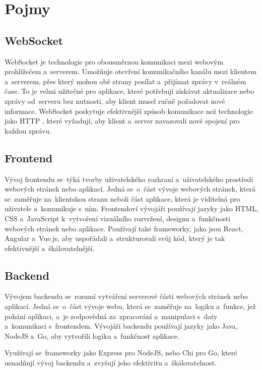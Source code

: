 \setlength{\headheight}{15.04742pt}
\section{Pojmy}

\subsection{WebSocket}\label{websocket} WebSocket \cite{websocket} je technologie pro obousměrnou komunikaci mezi webovým prohlížečem a~serverem. Umožňuje otevření komunikačního kanálu mezi klientem a~serverem, přes který mohou obě strany posílat a~přijímat zprávy v~reálném čase. To je velmi užitečné pro aplikace, které potřebují získávat aktualizace nebo zprávy od~serveru bez nutnosti, aby klient musel ručně požadovat nové informace. WebSocket poskytuje efektivnější způsob komunikace než technologie jako HTTP \cite{httpVSwebsocket}, které vyžadují, aby klient a~server navazovali nové spojení pro každou zprávu.
\subsection{Frontend} Vývoj frontendu se~týká tvorby uživatelského rozhraní a~uživatelského prostředí webových stránek nebo aplikací. Jedná se~o~část vývoje webových stránek, která se~zaměřuje na~klientskou stranu neboli část aplikace, která je viditelná pro uživatele a~komunikuje s~ním. Frontendoví vývojáři používají jazyky jako HTML, CSS a~JavaScript k~vytvoření vizuálního rozvržení, designu a~funkčnosti webových stránek nebo aplikace. Používají také frameworky, jako jsou React, Angular a~Vue.js, aby uspořádali a~strukturovali svůj kód, který je tak efektivnější a~škálovatelnější.
\subsection{Backend} Vývojem backendu se~rozumí vytváření serverové části webových stránek nebo aplikací. Jedná se~o~část vývoje webu, která se~zaměřuje na~logiku a~funkce, jež pohání aplikaci, a~je zodpovědná za~zpracování a~manipulaci s~daty a~komunikaci s~frontendem. Vývojáři backendu používají jazyky jako Java, NodeJS a~Go, aby vytvořili logiku a~funkčnost aplikace. \par Využívají se~frameworky jako Express pro NodeJS, nebo Chi pro Go, které usnadňují vývoj backendu a~zvyšují jeho efektivitu a~škálovatelnost.
